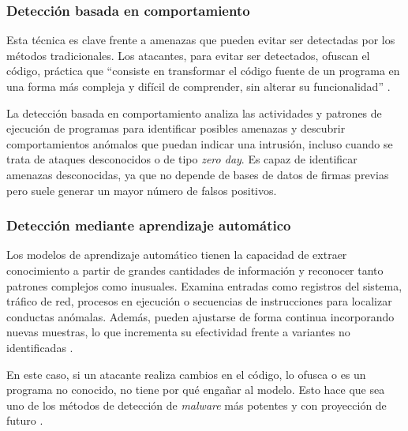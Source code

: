 \subsubsection{Detección basada en comportamiento}
\label{subsubsec:comportamiento}

Esta técnica es clave frente a amenazas que pueden evitar ser detectadas por los métodos tradicionales. Los atacantes, para evitar ser detectados, ofuscan el código, práctica que ``consiste en transformar el código fuente de un programa en una forma más compleja y difícil de comprender, sin alterar su funcionalidad'' \cite{ofuscacion}.

\vspace{1em}

La detección basada en comportamiento analiza las actividades y patrones de ejecución de programas para identificar posibles amenazas y descubrir comportamientos anómalos que puedan indicar una intrusión, incluso cuando se trata de ataques desconocidos o de tipo \textit{zero day}. Es capaz de identificar amenazas desconocidas, ya que no depende de bases de datos de firmas previas pero suele generar un mayor número de falsos positivos.

\subsubsection{Detección mediante aprendizaje automático}
\label{subsubsec:ml}

Los modelos de aprendizaje automático tienen la capacidad de extraer conocimiento a partir de grandes cantidades de información y reconocer tanto patrones complejos como inusuales. Examina entradas como registros del sistema, tráfico de red, procesos en ejecución o secuencias de instrucciones para localizar conductas anómalas. Además, pueden ajustarse de forma continua incorporando nuevas muestras, lo que incrementa su efectividad frente a variantes no identificadas \cite{s2grupo}.

\vspace{1em}

En este caso, si un atacante realiza cambios en el código, lo ofusca o es un programa no conocido, no tiene por qué engañar al modelo. Esto hace que sea uno de los métodos de detección de \textit{malware} más potentes y con proyección de futuro \cite{ml_mw}.

